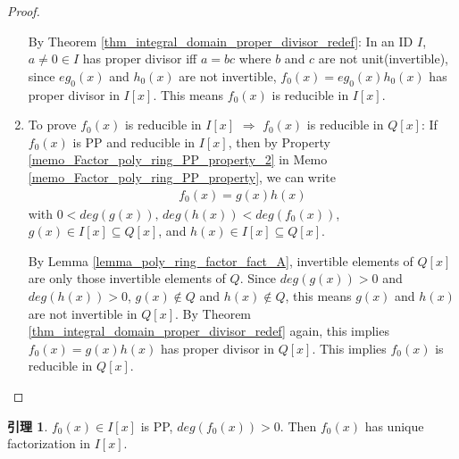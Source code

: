 \documentclass[utf8]{ctexbook}
\theoremstyle{definition}
\newtheorem{lemma}{引理}[section]
\begin{document}
\begin{proof}
\begin{enumerate}
{By Theorem \ref{thm_integral_domain_proper_divisor_redef}: In an ID $I$, $a \neq 0 \in I$ has proper divisor iff $a= bc$ where $b$ and $c$ are not unit(invertible), since $e g_0 (x)$ and $h_0 (x)$ are not invertible, $f_0 (x) = e g_0 (x) h_0 (x)$ has proper divisor in $I[x]$. This means $f_0 (x)$ is reducible in $I[x]$.
}
\item{To prove $f_0 (x)$ is reducible in $I[x]$ $\Longrightarrow$ $f_0 (x)$ is reducible in $Q[x]$: If $f_0 (x)$ is PP and reducible in $I[x]$, then by Property \ref{memo_Factor_poly_ring_PP_property_2} in Memo \ref{memo_Factor_poly_ring_PP_property}, we can write
\begin{align*}
f_0 (x) = g(x) h(x)
\end{align*}
with $0 < deg(g(x)), \, deg(h(x)) < deg(f_0 (x))$, $g(x) \in I[x] \subseteq Q[x]$, and $h(x) \in I[x] \subseteq Q[x]$. 

By Lemma \ref{lemma_poly_ring_factor_fact_A}, invertible elements of $Q[x]$ are only those invertible elements of $Q$. Since $deg(g(x)) > 0$ and $deg(h(x)) > 0$, $g(x) \not \in Q$ and $h(x) \not \in Q$, this means $g(x)$ and $h(x)$ are not invertible in $Q[x]$. By Theorem \ref{thm_integral_domain_proper_divisor_redef} again, this implies $f_0 (x) = g(x) h(x)$ has proper divisor in $Q[x]$. This implies $f_0 (x)$ is reducible in $Q[x]$.
}
\end{enumerate}

\end{proof}

\begin{lemma}
\label{lemma_Factor_poly_ring_4} $f_0 (x) \in I[x]$ is PP, $deg(f_0 (x)) > 0$. Then $f_0 (x)$ has unique factorization in $I[x]$.
\end{lemma}
\end{document}

